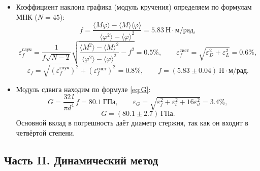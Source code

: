 \documentclass[12pt,a4paper]{article}
\begin{document}
\begin{itemize}
    \item Коэффициент наклона графика (модуль кручения) определяем по формулам МНК ($N=45$):
    \[
        f = \frac{\langle M\varphi\rangle - \langle M\rangle\langle\varphi\rangle}{\langle\varphi^2\rangle - \langle\varphi\rangle^2} = 5.83~\text{Н}\cdot\text{м/рад},
    \]
    \[
        \varepsilon_f^{\text{случ}} = \frac{1}{f\sqrt{N-2}}\sqrt{\frac{\langle M^2\rangle - \langle M\rangle^2}{\langle\varphi^2\rangle - \langle\varphi\rangle^2} - f^2} = 0.5\%,
        \qquad
        \varepsilon_f^{\text{сист}} = \sqrt{\varepsilon_D^2 + \varepsilon_L^2} = 0.6\%,
    \]
    \[
        \varepsilon_f = \sqrt{\left(\varepsilon_f^{\text{случ}}\right)^2 + \left(\varepsilon_f^{\text{сист}}\right)^2} = 0.8\%, \qquad f = (5.83 \pm 0.04)~\text{Н}\cdot\text{м/рад}.
    \]

    \item Модуль сдвига находим по формуле \eqref{eq:G}:
    \[
        G = \frac{32\,l}{\pi d^4}\,f = 80.1~\text{ГПа}, \qquad
        \varepsilon_G = \sqrt{\varepsilon_f^2 + \varepsilon_l^2 + 16\varepsilon_d^2} = 3.4\%,
    \]
    \[
        G = (80.1 \pm 2.7)~\text{ГПа}.
    \]
    Основной вклад в погрешность даёт диаметр стержня, так как он входит в четвёртой степени.
\end{itemize}

\subsection{Часть II. Динамический метод}
\end{document}

